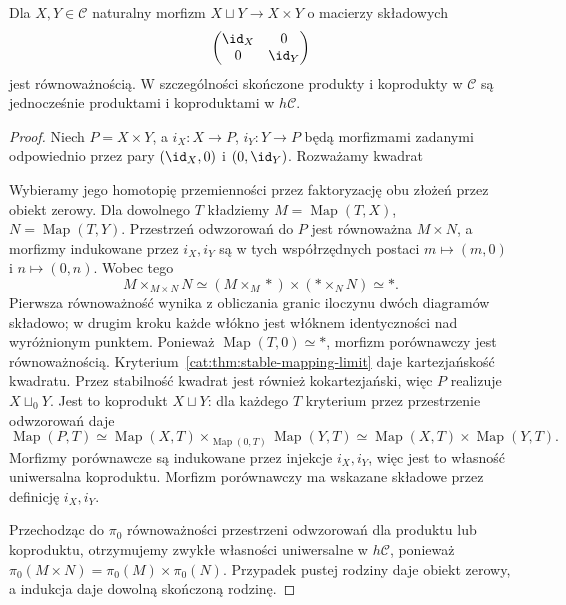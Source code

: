 \begin{twierdzenie}\label{cat:thm:stable-biproducts}
Dla $X,Y\in\mathcal C$ naturalny morfizm $X\sqcup Y\to X\times Y$ o macierzy składowych
\[
 \begin{pmatrix}\id_X&0\\0&\id_Y\end{pmatrix}
\]
jest równoważnością. W szczególności skończone produkty i koprodukty w $\mathcal C$ są jednocześnie produktami i koproduktami w $h\mathcal C$.
\end{twierdzenie}
\begin{proof}
Niech $P=X\times Y$, a $i_X:X\to P$, $i_Y:Y\to P$ będą morfizmami zadanymi odpowiednio przez pary $(\id_X,0)$ i $(0,\id_Y)$. Rozważamy kwadrat
\begin{center}
\end{center}
Wybieramy jego homotopię przemienności przez faktoryzację obu złożeń przez obiekt zerowy. Dla dowolnego $T$ kładziemy $M=\operatorname{Map}(T,X)$, $N=\operatorname{Map}(T,Y)$. Przestrzeń odwzorowań do $P$ jest równoważna $M\times N$, a morfizmy indukowane przez $i_X,i_Y$ są w tych współrzędnych postaci $m\mapsto(m,0)$ i $n\mapsto(0,n)$. Wobec tego
\[
 M\times_{M\times N}N
 \simeq (M\times_M *)\times(*\times_N N)
 \simeq *.
\]
Pierwsza równoważność wynika z obliczania granic iloczynu dwóch diagramów składowo; w drugim kroku każde włókno jest włóknem identyczności nad wyróżnionym punktem. Ponieważ $\operatorname{Map}(T,0)\simeq *$, morfizm porównawczy jest równoważnością. Kryterium~\ref{cat:thm:stable-mapping-limit} daje kartezjańskość kwadratu. Przez stabilność kwadrat jest również kokartezjański, więc $P$ realizuje $X\sqcup_0Y$. Jest to koprodukt $X\sqcup Y$: dla każdego $T$ kryterium przez przestrzenie odwzorowań daje
\[
 \operatorname{Map}(P,T)\simeq
 \operatorname{Map}(X,T)\times_{\operatorname{Map}(0,T)}
 \operatorname{Map}(Y,T)\simeq
 \operatorname{Map}(X,T)\times\operatorname{Map}(Y,T).
\]
Morfizmy porównawcze są indukowane przez injekcje $i_X,i_Y$, więc jest to własność uniwersalna koproduktu. Morfizm porównawczy ma wskazane składowe przez definicję $i_X,i_Y$.

Przechodząc do $\pi_0$ równoważności przestrzeni odwzorowań dla produktu lub koproduktu, otrzymujemy zwykłe własności uniwersalne w $h\mathcal C$, ponieważ $\pi_0(M\times N)=\pi_0(M)\times\pi_0(N)$. Przypadek pustej rodziny daje obiekt zerowy, a indukcja daje dowolną skończoną rodzinę.
\end{proof}


